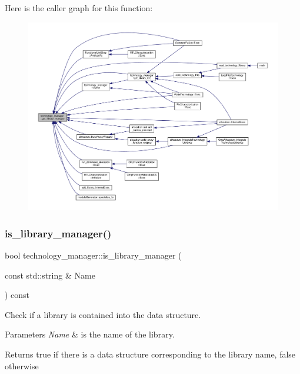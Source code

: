 Here is the caller graph for this function\+:
\nopagebreak
\begin{figure}[H]
\begin{center}
\leavevmode
\includegraphics[width=350pt]{df/dc7/classtechnology__manager_af288b80068545def60e503ceddc109ae_icgraph}
\end{center}
\end{figure}
\mbox{\label{classtechnology__manager_ae07845b64a58c7b505ee7efe03f5c220}} 
\subsubsection{\texorpdfstring{is\+\_\+library\+\_\+manager()}{is\_library\_manager()}}
{\footnotesize\ttfamily bool technology\+\_\+manager\+::is\+\_\+library\+\_\+manager (\begin{DoxyParamCaption}\item[{const std\+::string \&}]{Name }\end{DoxyParamCaption}) const}



Check if a library is contained into the data structure. 


\begin{DoxyParams}{Parameters}
{\em Name} & is the name of the library. \\
\hline
\end{DoxyParams}
\begin{DoxyReturn}{Returns}
true if there is a data structure corresponding to the library name, false otherwise 
\end{DoxyReturn}


